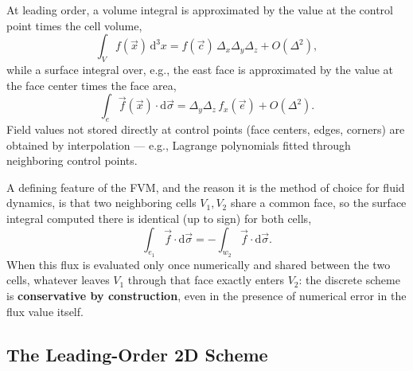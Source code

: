 \documentclass[11pt]{article}
\newcommand{\vx}{\vec{x}}
\newcommand{\vf}{\vec{f}}
\begin{document}
At leading order, a volume integral is approximated by the value at the control point times the cell volume,
\begin{equation}
  \int_V f(\vx)\,\mathrm{d}^3x = f(\vec c)\,\Delta_x\Delta_y\Delta_z + O(\Delta^2),
\end{equation}
while a surface integral over, e.g., the east face is approximated by the value at the face center times the face area,
\begin{equation}
  \int_e \vf(\vx)\cdot\mathrm{d}\vec\sigma = \Delta_y\Delta_z\,f_x(\vec e) + O(\Delta^2).
\end{equation}
Field values not stored directly at control points (face centers, edges, corners) are obtained by interpolation — e.g., Lagrange polynomials fitted through neighboring control points.

A defining feature of the FVM, and the reason it is the method of choice for fluid dynamics, is that two neighboring cells $V_1,V_2$ share a common face, so the surface integral computed there is identical (up to sign) for both cells,
\begin{equation}
  \int_{e_1} \vf\cdot\mathrm{d}\vec\sigma = -\int_{w_2} \vf\cdot\mathrm{d}\vec\sigma .
\end{equation}
When this flux is evaluated only once numerically and shared between the two cells, whatever leaves $V_1$ through that face exactly enters $V_2$: the discrete scheme is \textbf{conservative by construction}, even in the presence of numerical error in the flux value itself.

\subsection{The Leading-Order 2D Scheme}
\end{document}
